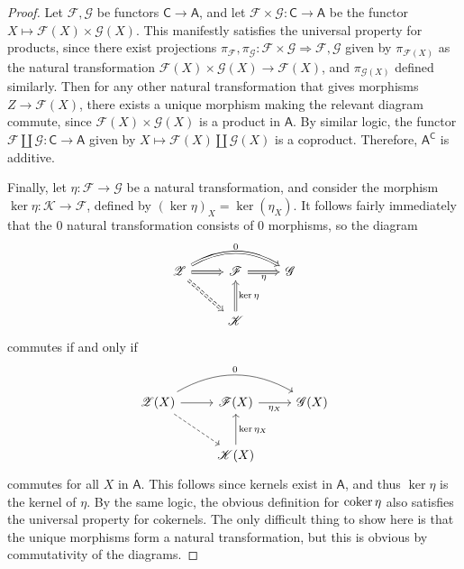 \documentclass[11pt]{report}
\begin{document}
\begin{proof}
	Let $\mathscr{F} ,\mathscr{G} $ be functors $\mathsf{C} \to \mathsf{A} $, and let $\mathscr{F} \times \mathscr{G} : \mathsf{C}  \to \mathsf{A} $ be the functor $X\mapsto \mathscr{F} (X)\times \mathscr{G} (X)$. This manifestly satisfies the universal property for products, since there exist projections $\pi_{\mathscr{F} } ,\pi_{\mathscr{G} } : \mathscr{F} \times \mathscr{G}  \Rightarrow \mathscr{F} ,\mathscr{G} $ given by $\pi_{\mathscr{F}(X)} $ as the natural transformation $\mathscr{F} (X)\times \mathscr{G} (X)\to \mathscr{F} (X)$, and $\pi_{\mathscr{G} (X)} $ defined similarly. Then for any other natural transformation that gives morphisms $Z\to \mathscr{F} (X)$, there exists a unique morphism making the relevant diagram commute, since $\mathscr{F} (X)\times \mathscr{G} (X)$ is a product in $\mathsf{A} $. By similar logic, the functor $\mathscr{F} \amalg \mathscr{G} : \mathsf{C}  \to \mathsf{A} $ given by $X\mapsto \mathscr{F} (X)\amalg \mathscr{G} (X)$ is a coproduct. Therefore, $\mathsf{A} ^{\mathsf{C} } $ is additive.

	Finally, let $\eta : \mathscr{F}  \to \mathscr{G} $ be a natural transformation, and consider the morphism $\ker \eta : \mathscr{K}  \to \mathscr{F} $, defined by $\left( \ker \eta  \right)_X=\ker \left( \eta _X \right) $. It follows fairly immediately that the 0 natural transformation consists of 0 morphisms, so the diagram
	\[\begin{tikzcd}[row sep = 2.5em, column sep = 2.5em]
		\mathscr{Z} \arrow[r, Rightarrow]\arrow[rr, Rightarrow, bend left, "0"]\arrow[dr, Rightarrow, dashed]&\mathscr{F} \arrow[r, Rightarrow, "\eta "']&\mathscr{G} \\
													       &\mathscr{K} \arrow[u, Rightarrow, "\ker \eta "']
	\end{tikzcd}\]
	commutes if and only if
	\[\begin{tikzcd}[row sep = 2.5em, column sep = 2.5em]
		\mathscr{Z} (X)\arrow[rr, bend left, "0"]\arrow[dr, dashed]\arrow[r]&\mathscr{F}(X) \arrow[r, "\eta _X"']&\mathscr{G} (X)\\
										    &\mathscr{K} (X)\arrow[u, "\ker \eta _X"']
	\end{tikzcd}\]
	commutes for all $X$ in $\mathsf{A} $. This follows since kernels exist in $\mathsf{A} $, and thus $\ker \eta $ is the kernel of $\eta $. By the same logic, the obvious definition for $\operatorname{coker} \eta $ also satisfies the universal property for cokernels. The only difficult thing to show here is that the unique morphisms form a natural transformation, but this is obvious by commutativity of the diagrams.


\end{proof}
\end{document}
